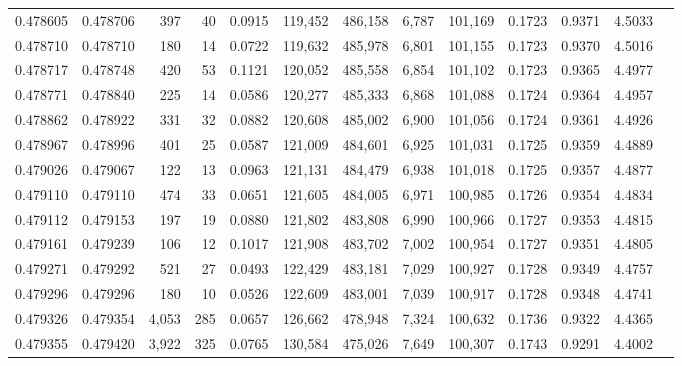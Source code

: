 \begin{tabular}{rrrrrrrrrrrrr}
0.478605 & 0.478706 &   397 &    40 &                                     0.0915 & 119,452 & 486,158 &   6,787 & 101,169 & 0.1723 & 0.9371 & 4.5033 \\
0.478710 & 0.478710 &   180 &    14 &                                     0.0722 & 119,632 & 485,978 &   6,801 & 101,155 & 0.1723 & 0.9370 & 4.5016 \\
0.478717 & 0.478748 &   420 &    53 &                                     0.1121 & 120,052 & 485,558 &   6,854 & 101,102 & 0.1723 & 0.9365 & 4.4977 \\
0.478771 & 0.478840 &   225 &    14 &                                     0.0586 & 120,277 & 485,333 &   6,868 & 101,088 & 0.1724 & 0.9364 & 4.4957 \\
0.478862 & 0.478922 &   331 &    32 &                                     0.0882 & 120,608 & 485,002 &   6,900 & 101,056 & 0.1724 & 0.9361 & 4.4926 \\
0.478967 & 0.478996 &   401 &    25 &                                     0.0587 & 121,009 & 484,601 &   6,925 & 101,031 & 0.1725 & 0.9359 & 4.4889 \\
0.479026 & 0.479067 &   122 &    13 &                                     0.0963 & 121,131 & 484,479 &   6,938 & 101,018 & 0.1725 & 0.9357 & 4.4877 \\
0.479110 & 0.479110 &   474 &    33 &                                     0.0651 & 121,605 & 484,005 &   6,971 & 100,985 & 0.1726 & 0.9354 & 4.4834 \\
0.479112 & 0.479153 &   197 &    19 &                                     0.0880 & 121,802 & 483,808 &   6,990 & 100,966 & 0.1727 & 0.9353 & 4.4815 \\
0.479161 & 0.479239 &   106 &    12 &                                     0.1017 & 121,908 & 483,702 &   7,002 & 100,954 & 0.1727 & 0.9351 & 4.4805 \\
0.479271 & 0.479292 &   521 &    27 &                                     0.0493 & 122,429 & 483,181 &   7,029 & 100,927 & 0.1728 & 0.9349 & 4.4757 \\
0.479296 & 0.479296 &   180 &    10 &                                     0.0526 & 122,609 & 483,001 &   7,039 & 100,917 & 0.1728 & 0.9348 & 4.4741 \\
0.479326 & 0.479354 & 4,053 &   285 &                                     0.0657 & 126,662 & 478,948 &   7,324 & 100,632 & 0.1736 & 0.9322 & 4.4365 \\
0.479355 & 0.479420 & 3,922 &   325 &                                     0.0765 & 130,584 & 475,026 &   7,649 & 100,307 & 0.1743 & 0.9291 & 4.4002 \\

\end{tabular}

